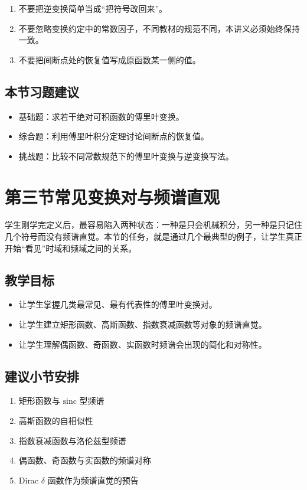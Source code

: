 \begin{jinshi}[本节易错点]
\begin{enumerate}
    \item 不要把逆变换简单当成``把符号改回来''。
    \item 不要忽略变换约定中的常数因子，不同教材的规范不同，本讲义必须始终保持一致。
    \item 不要把间断点处的恢复值写成原函数某一侧的值。
\end{enumerate}
\end{jinshi}

\subsection*{本节习题建议}
\begin{itemize}
    \item 基础题：求若干绝对可积函数的傅里叶变换。
    \item 综合题：利用傅里叶积分定理讨论间断点的恢复值。
    \item 挑战题：比较不同常数规范下的傅里叶变换与逆变换写法。
\end{itemize}

\section{第三节\quad 常见变换对与频谱直观}

\begin{wulibj}[本节要解决的问题]
学生刚学完定义后，最容易陷入两种状态：一种是只会机械积分，另一种是只记住几个符号而没有频谱直觉。本节的任务，就是通过几个最典型的例子，让学生真正开始``看见''时域和频域之间的关系。
\end{wulibj}

\subsection*{教学目标}
\begin{itemize}
    \item 让学生掌握几类最常见、最有代表性的傅里叶变换对。
    \item 让学生建立矩形函数、高斯函数、指数衰减函数等对象的频谱直觉。
    \item 让学生理解偶函数、奇函数、实函数时频谱会出现的简化和对称性。
\end{itemize}

\subsection*{建议小节安排}
\begin{enumerate}
    \item 矩形函数与 $\mathrm{sinc}$ 型频谱
    \item 高斯函数的自相似性
    \item 指数衰减函数与洛伦兹型频谱
    \item 偶函数、奇函数与实函数的频谱对称
    \item Dirac $\delta$ 函数作为频谱直觉的预告
\end{enumerate}

